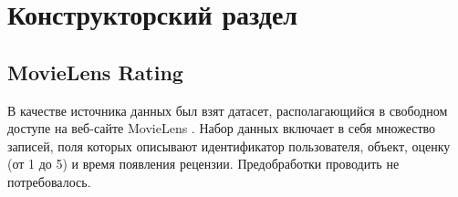 \section{Конструкторский раздел}

\subsection{MovieLens Rating}

В качестве источника данных был взят датасет, располагающийся в свободном доступе на веб-сайте MovieLens \cite{dataset}. Набор данных включает в себя множество записей, поля которых описывают идентификатор пользователя, объект, оценку (от 1 до 5) и время появления рецензии. Предобработки проводить не потребовалось.

\pagebreak